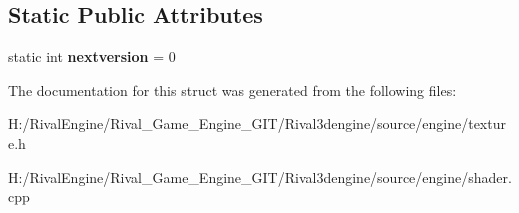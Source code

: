 \subsection*{Static Public Attributes}
\begin{DoxyCompactItemize}
\item 
\mbox{\label{struct_global_shader_param_state_ae860579748fdf561bb34a49d3ec99a90}} 
static int {\bfseries nextversion} = 0
\end{DoxyCompactItemize}


The documentation for this struct was generated from the following files\+:\begin{DoxyCompactItemize}
\item 
H\+:/\+Rival\+Engine/\+Rival\+\_\+\+Game\+\_\+\+Engine\+\_\+\+G\+I\+T/\+Rival3dengine/source/engine/texture.\+h\item 
H\+:/\+Rival\+Engine/\+Rival\+\_\+\+Game\+\_\+\+Engine\+\_\+\+G\+I\+T/\+Rival3dengine/source/engine/shader.\+cpp\end{DoxyCompactItemize}
